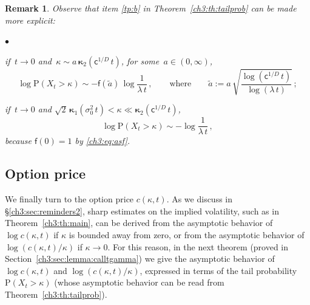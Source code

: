 \documentclass[a4paper,reqno,11pt]{amsart}
\numberwithin{equation}{section}
\newtheorem{remark}[theorem]{Remark}
\renewcommand{\tilde}{\widetilde}          %
\newcommand{\PEfont}{\mathrm}
\renewcommand{\P}{\ensuremath{\PEfont P}}
\newcommand\sfc{\mathsf{c}}
\newcommand\sff{\mathsf{f}}
\newenvironment{myitemize}{%
\begin{list}{$\bullet$}%
 	{%
	\setlength{\itemsep}{0.4em}%
	\setlength{\topsep}{0.5em}%
	\setlength\leftmargin{2.45em}%
	\setlength\labelwidth{2.05em}%
	\setlength{\labelsep}{0.4em}%
	}%
	}%
{\end{list}}
\renewenvironment{itemize}{
\begin{myitemize}}%
{\end{myitemize}}
\newcommand\bkappa{\boldsymbol{\kappa}}
\begin{document}
\begin{remark}\rm\label{ch3:rem:tpbexplicit}
Observe that item \eqref{tp:b} in Theorem~\ref{ch3:th:tailprob}
can be made more explicit:
\begin{itemize}
\item if $\,t\to 0$ and $\,\kappa \sim a\, \bkappa_2(\sfc^{1/D} \,t)$, 
for some $\,a \in (0,\infty)$,
\begin{equation} \label{ch3:eq:withfa}
	\log\P(X_t > \kappa) \sim - \sff( \tilde a) \, \log \frac{1}{ \lambda \,t} \,,
	\qquad \text{where} \qquad
	\tilde a := a \, \sqrt{\frac{\log (\sfc^{1/D} \, t)}{\log (\lambda \, t)} } \,;
\end{equation}

\item
if $\,t\to 0$ and $\sqrt{2} \, \bkappa_1(\sigma_0^2 \, t) 
< \kappa \ll \bkappa_2(\sfc^{1/D} \, t)$,
\begin{equation} \label{ch3:eq:withoutfa1}
	\log\P(X_t > \kappa) \sim - \log \frac{1}{ \lambda \, t} \,,
\end{equation}
because $\sff(0) = 1$ by \eqref{ch3:eq:asf}.
\end{itemize}
\end{remark}


\subsection{Option price}
We finally turn to the option price $c(\kappa,t)$.
As we discuss in \S\ref{ch3:sec:reminders2}, 
sharp estimates on the implied volatility, such as in Theorem~\ref{ch3:th:main},
can be derived from the asymptotic behavior of $\log c(\kappa,t)$
if $\kappa$ is bounded away from zero, or from
the asymptotic behavior of $\log (c(\kappa,t)/\kappa)$
if $\kappa \to 0$. For this reason, in 
the next theorem (proved in Section~\ref{ch3:sec:lemma:calltgamma})
we give the asymptotic behavior of $\log c(\kappa,t)$
and $\log ( c(\kappa,t) / \kappa )$, expressed
in terms of the tail probability $\P(X_t > \kappa)$
(whose asymptotic behavior can be read from Theorem~\ref{ch3:th:tailprob}).
\end{document}
